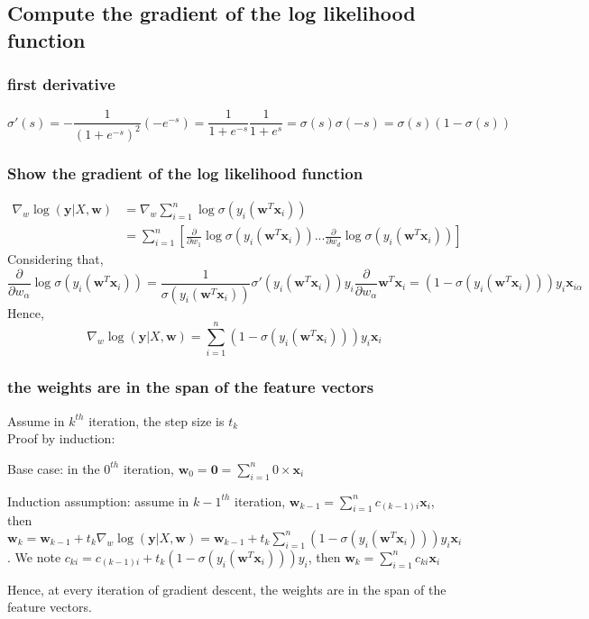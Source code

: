 \documentclass{article}
\begin{document}
	\subsection{Compute the gradient of the log likelihood function}
	\subsubsection{first derivative}
	\[\sigma'(s)=-\frac{1}{(1+e^{-s})^2}(-e^{-s})=\frac{1}{1+e^{-s}}\frac{1}{1+e^s}=\sigma(s)\sigma(-s)=\sigma(s)(1-\sigma(s))\]

	\subsubsection{Show the gradient of the log likelihood function}
	\[
	\begin{split}
		\nabla_w\log(\textbf{y}|X, \textbf{w})&=\nabla_w\sum_{i=1}^n{\log\sigma(y_i(\textbf{w}^T\textbf{x}_i))}\\
		&=\sum_{i=1}^n {[\frac{\partial}{\partial w_1}\log\sigma(y_i(\textbf{w}^T\textbf{x}_i))...\frac{\partial}{\partial w_d}\log\sigma(y_i(\textbf{w}^T\textbf{x}_i))]}
	\end{split}
	\]
	Considering that,
	\[
		\frac{\partial}{\partial w_\alpha}\log\sigma(y_i(\textbf{w}^T\textbf{x}_i)) = \frac{1}{\sigma(y_i(\textbf{w}^T\textbf{x}_i))}\sigma'(y_i(\textbf{w}^T\textbf{x}_i))y_i\frac{\partial}{\partial w_\alpha}\textbf{w}^T\textbf{x}_i=(1-\sigma(y_i(\textbf{w}^T\textbf{x}_i)))y_i\textbf{x}_{i\alpha}
	\]
	Hence,
	\[\nabla_w\log(\textbf{y}|X, \textbf{w})=\sum_{i=1}^n {(1-\sigma(y_i(\textbf{w}^T\textbf{x}_i)))y_i\textbf{x}_{i}}\]
	
	\subsubsection{the weights are in the span of the feature vectors}
	Assume in $k^{th}$ iteration, the step size is $t_k$\\
	Proof by induction:\par
	Base case: in the $0^{th}$ iteration, $\textbf{w}_0=\textbf{0}=\sum_{i=1}^n0\times\textbf{x}_i$\par
	Induction assumption: assume in $k-1^{th}$ iteration, $\textbf{w}_{k-1}=\sum_{i=1}^nc_{(k-1)i}\textbf{x}_i$, then $\textbf{w}_{k}=\textbf{w}_{k-1}+t_k\nabla_w\log(\textbf{y}|X, \textbf{w})=\textbf{w}_{k-1}+t_k\sum_{i=1}^n {(1-\sigma(y_i(\textbf{w}^T\textbf{x}_i)))y_i\textbf{x}_{i}}$. We note $c_{ki}=c_{(k-1)i}+t_k(1-\sigma(y_i(\textbf{w}^T\textbf{x}_i)))y_i$, then $\textbf{w}_{k}=\sum_{i=1}^nc_{ki}\textbf{x}_i$\par
	Hence, at every iteration of gradient descent, the weights are in the span of the feature vectors.\par
	
\end{document}
